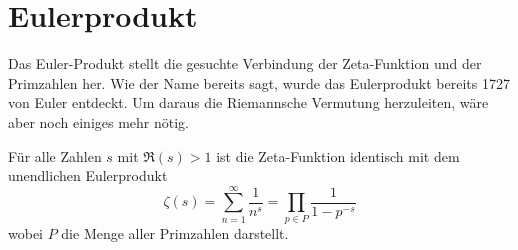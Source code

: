 \section{Eulerprodukt} \label{zeta:section:eulerprodukt}

Das Euler-Produkt stellt die gesuchte Verbindung der Zeta-Funktion und der Primzahlen her.
%
Wie der Name bereits sagt, wurde das Eulerprodukt bereits 1727 von Euler entdeckt.
Um daraus die Riemannsche Vermutung herzuleiten, wäre aber noch einiges mehr nötig.

\begin{satz}
    Für alle Zahlen $s$ mit $\Re(s) > 1$ ist die Zeta-Funktion identisch mit dem unendlichen Eulerprodukt
    \begin{equation}\label{zeta:eq:eulerprodukt}
        \zeta(s)
        =
        \sum_{n=1}^\infty
        \frac{1}{n^s}
        =
        \prod_{p \in P}
        \frac{1}{1-p^{-s}}
    \end{equation}
    wobei $P$ die Menge aller Primzahlen darstellt.
%
\end{satz}

